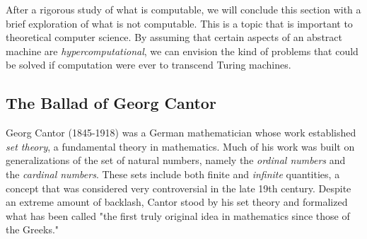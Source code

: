 After a rigorous study of what is computable, we will conclude this section with a brief exploration of what is not computable. This is a topic that is important to theoretical computer science. By assuming that certain aspects of an abstract machine are \textit{hypercomputational}, we can envision the kind of problems that could be solved if computation were ever to transcend Turing machines. \\


\subsection{The Ballad of Georg Cantor}

Georg Cantor (1845-1918) was a German mathematician whose work established \textit{set theory}, a fundamental theory in mathematics. Much of his work was built on generalizations of the set of natural numbers, namely the \textit{ordinal numbers} and the \textit{cardinal numbers}. These sets include both finite and \textit{infinite} quantities, a concept that was considered very controversial in the late 19th century. Despite an extreme amount of backlash, Cantor stood by his set theory and formalized what has been called "the first truly original idea in mathematics since those of the Greeks." \\


